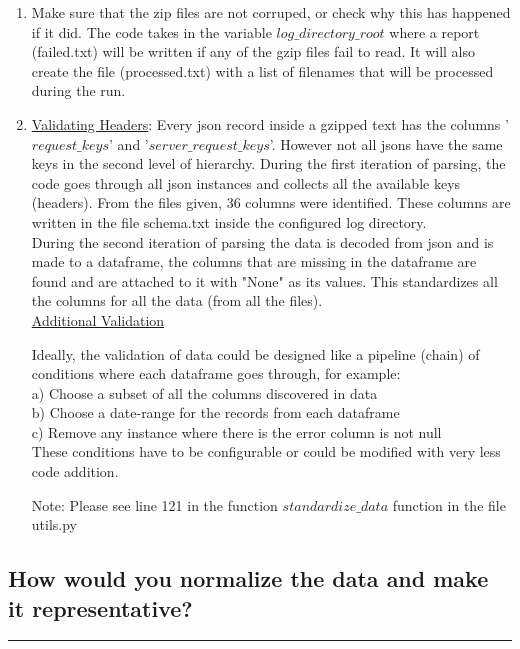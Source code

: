 \documentclass[11pt]{article}
\begin{document}
\begin{enumerate}
\item Make sure that the zip files are not corruped, or check why this has happened if it did. The code takes in the variable \emph{\(log\_directory\_root\)}
where a report (failed.txt) will be written if any of the gzip files fail to read.
It will also create the file (processed.txt) with a list of filenames that will be processed during the run. \\

\item \uline{Validating Headers}: Every json record inside a gzipped text has the columns '\(request\_keys\)' and '\(server\_request\_keys\)'. However not all jsons have the
same keys in the second level of hierarchy. During the first iteration of parsing, the code goes through all json instances and collects all the
available keys (headers). From the files given, 36 columns were identified. These columns are written in the file schema.txt inside the configured log directory. \\

During the second iteration of parsing the data is decoded from json and is made to a dataframe, the columns that are missing in the dataframe are found and are attached
to it with "None" as its values. This standardizes all the columns for all the data (from all the files). \\

\uline{Additional Validation}

Ideally, the validation of data could be designed like a pipeline (chain) of conditions where each dataframe goes through, for example: \\

a) Choose a subset of all the columns discovered in data \\
b) Choose a date-range for the records from each dataframe \\
c) Remove any instance where there is the error column is not null \\

These conditions have to be configurable or could be modified with very less code addition.

Note: Please see line 121 in the function \emph{\(standardize\_data\)} function in the file utils.py
\end{enumerate}

\subsection{How would you normalize the data and make it representative?}
\label{sec:orgf14d165}
\noindent\rule{\textwidth}{0.5pt}
\end{document}
